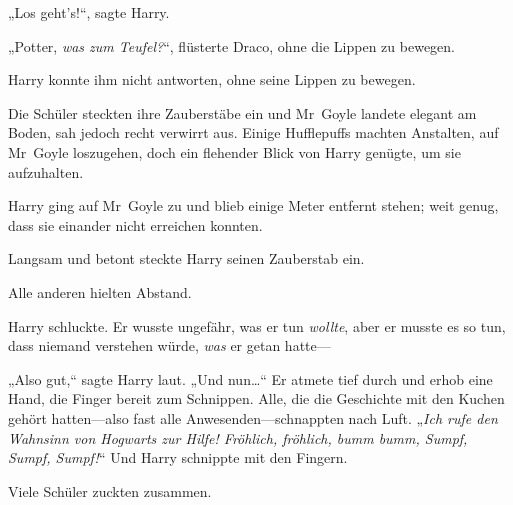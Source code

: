 „Los geht’s!“, sagte Harry.

„Potter, \emph{was zum Teufel?}“, flüsterte Draco, ohne die Lippen zu bewegen.

Harry konnte ihm nicht antworten, ohne seine Lippen zu bewegen.

Die Schüler steckten ihre Zauberstäbe ein und Mr~Goyle landete elegant am Boden, sah jedoch recht verwirrt aus. Einige Hufflepuffs machten Anstalten, auf Mr~Goyle loszugehen, doch ein flehender Blick von Harry genügte, um sie aufzuhalten.

Harry ging auf Mr~Goyle zu und blieb einige Meter entfernt stehen; weit genug, dass sie einander nicht erreichen konnten.

Langsam und betont steckte Harry seinen Zauberstab ein.

Alle anderen hielten Abstand.

Harry schluckte. Er wusste ungefähr, was er tun \emph{wollte}, aber er musste es so tun, dass niemand verstehen würde, \emph{was} er getan hatte—

„Also gut,“ sagte Harry laut. „Und nun…“ Er atmete tief durch und erhob eine Hand, die Finger bereit zum Schnippen. Alle, die die Geschichte mit den Kuchen gehört hatten—also fast alle Anwesenden—schnappten nach Luft. „\emph{Ich rufe den Wahnsinn von Hogwarts zur Hilfe! Fröhlich, fröhlich, bumm bumm, Sumpf, Sumpf, Sumpf!}“ Und Harry schnippte mit den Fingern.

Viele Schüler zuckten zusammen.

